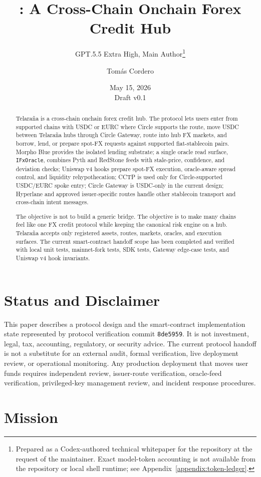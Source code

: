 \documentclass[11pt]{article}
\title{\protocol: A Cross-Chain Onchain Forex Credit Hub}
\author{
  GPT.5.5 Extra High, Main Author\thanks{Prepared as a Codex-authored technical whitepaper for the \repo{} repository at the request of the maintainer. Exact model-token accounting is not available from the repository or local shell runtime; see Appendix~\ref{appendix:token-ledger}.}
  \and Tom\'as Cordero
}
\date{May 15, 2026 \\ Draft v0.1}
\newcommand{\protocol}{Telara\~na}
\newcommand{\commithead}{\texttt{8de5959}}
\begin{document}
\maketitle

\begin{abstract}
\protocol{} is a cross-chain onchain forex credit hub. The protocol lets users
enter from supported chains with USDC or EURC where Circle supports the route,
move USDC between \protocol{} hubs through Circle Gateway, route into hub FX
markets, and borrow, lend, or prepare spot-FX requests against supported
fiat-stablecoin pairs. Morpho Blue provides the isolated lending substrate; a
single oracle read surface,
\texttt{IFxOracle}, combines Pyth and RedStone feeds with stale-price,
confidence, and deviation checks; Uniswap v4 hooks prepare spot-FX execution,
oracle-aware spread control, and liquidity rehypothecation; CCTP is used only
for Circle-supported USDC/EURC spoke entry; Circle Gateway is USDC-only in the
current design; Hyperlane and approved issuer-specific routes handle other
stablecoin transport and cross-chain intent messages.

The objective is not to build a generic bridge. The objective is to make many
chains feel like one FX credit protocol while keeping the canonical risk engine
on a hub. \protocol{} accepts only registered assets, routes, markets, oracles,
and execution surfaces. The current smart-contract handoff scope has been
completed and verified with local unit tests, mainnet-fork tests, SDK tests,
Gateway edge-case tests, and Uniswap v4 hook invariants.
\end{abstract}

\section*{Status and Disclaimer}

This paper describes a protocol design and the smart-contract implementation
state represented by protocol verification commit \commithead{}. It is not investment,
legal, tax, accounting, regulatory, or security advice. The current protocol
handoff is not a substitute for an external audit, formal verification, live
deployment review, or operational monitoring. Any production deployment that
moves user funds requires independent review, issuer-route verification,
oracle-feed verification, privileged-key management review, and incident
response procedures.

\section{Mission}
\end{document}
